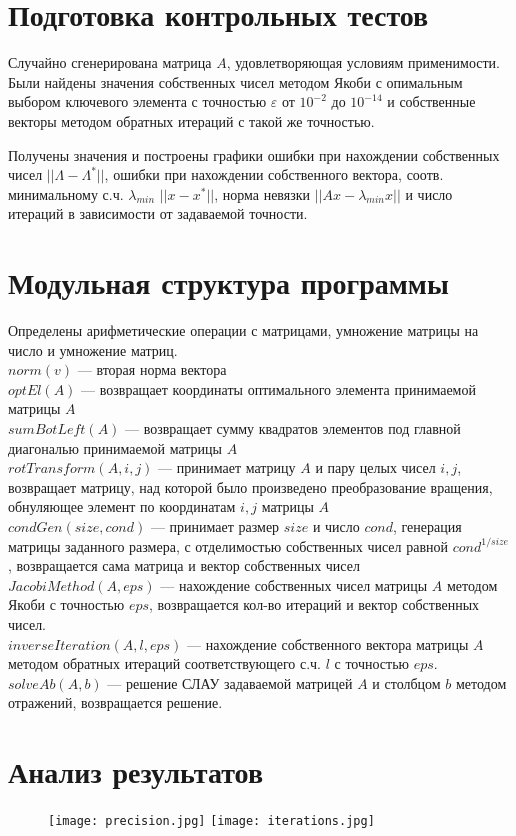 \documentclass[11pt,a4paper]{article}
\let\epsilon\varepsilon
\renewcommand\;{\hspace{1cm}}
\begin{document}
\section{Подготовка контрольных тестов}
Случайно сгенерирована матрица $A$, удовлетворяющая условиям применимости. Были найдены значения собственных чисел методом Якоби с опимальным выбором ключевого элемента
с точностью $\epsilon$ от $10^{-2}$ до $10^{-14}$ и собственные векторы методом обратных итераций с такой же точностью.

Получены значения и построены графики ошибки при нахождении собственных чисел $||\Lambda - \Lambda^{*}||$,
ошибки при нахождении собственного вектора, соотв. минимальному с.ч. $\lambda_{min}$ $||x-x^{*}||$, норма невязки $||Ax - \lambda_{min} x||$ и число итераций в зависимости от задаваемой точности.
\section{Модульная структура программы}
Определены арифметические операции с матрицами, умножение матрицы на число и умножение матриц.\\
$norm(v)$ --- вторая норма вектора\\
$optEl(A)$ --- возвращает координаты оптимального элемента принимаемой матрицы $A$\\
$sumBotLeft(A)$ --- возвращает сумму квадратов элементов под главной диагональю принимаемой матрицы $A$\\
$rotTransform(A, i,j)$ --- принимает матрицу $A$ и пару целых чисел $i,j$, возвращает матрицу, над которой было произведено преобразование вращения, обнуляющее элемент по координатам $i,j$ матрицы $A$\\
$condGen(size, cond)$ --- принимает размер $size$ и число $cond$, генерация матрицы заданного размера, с отделимостью собственных чисел равной $cond^{1/size}$, возвращается сама матрица и вектор собственных чисел\\
$JacobiMethod(A, eps)$ --- нахождение собственных чисел матрицы $A$ методом Якоби с точностью $eps$, возвращается кол-во итераций и вектор собственных чисел.\\
$inverseIteration(A,l,eps)$ --- нахождение собственного вектора матрицы $A$ методом обратных итераций соответствующего с.ч. $l$ с точностью $eps$.
$solveAb(A,b)$ --- решение СЛАУ задаваемой матрицей $A$ и столбцом $b$ методом отражений, возвращается решение.
\pagebreak
\section{Анализ результатов}
\begin{figure}[h]
\texttt{[image: precision.jpg]}
\texttt{[image: iterations.jpg]}
\end{figure}
\end{document}
